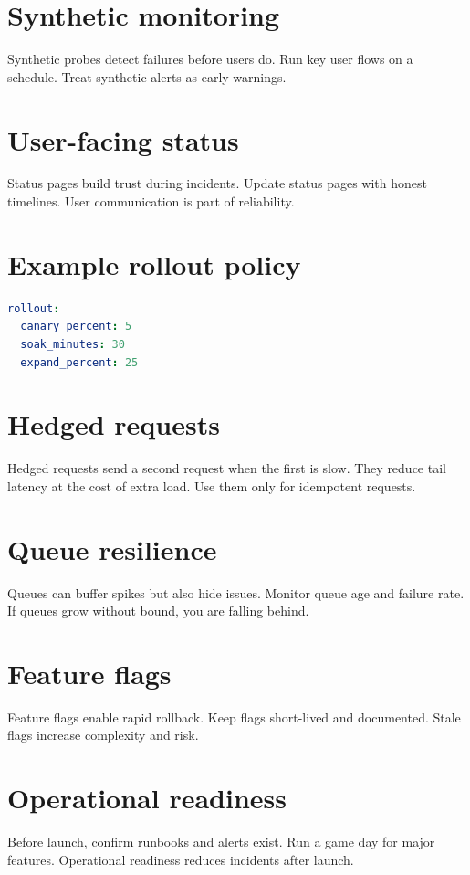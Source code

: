 \section{Synthetic monitoring}
Synthetic probes detect failures before users do.
Run key user flows on a schedule.
Treat synthetic alerts as early warnings.

\section{User-facing status}
Status pages build trust during incidents.
Update status pages with honest timelines.
User communication is part of reliability.

\section{Example rollout policy}
\begin{lstlisting}[language=YAML]
rollout:
  canary_percent: 5
  soak_minutes: 30
  expand_percent: 25
\end{lstlisting}

\section{Hedged requests}
Hedged requests send a second request when the first is slow.
They reduce tail latency at the cost of extra load.
Use them only for idempotent requests.

\section{Queue resilience}
Queues can buffer spikes but also hide issues.
Monitor queue age and failure rate.
If queues grow without bound, you are falling behind.

\section{Feature flags}
Feature flags enable rapid rollback.
Keep flags short-lived and documented.
Stale flags increase complexity and risk.

\section{Operational readiness}
Before launch, confirm runbooks and alerts exist.
Run a game day for major features.
Operational readiness reduces incidents after launch.

